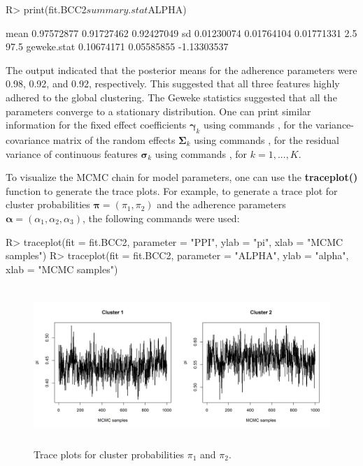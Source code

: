 \begin{example}
R> print(fit.BCC2$summary.stat$ALPHA)
\end{example} 

\begin{example}
                  [,1]       [,2]        [,3]
mean        0.97572877 0.91727462  0.92427049
sd          0.01230074 0.01764104  0.01771331
2.5%
97.5%
geweke.stat 0.10674171 0.05585855 -1.13303537
\end{example}

The output indicated that the posterior means for the adherence parameters were 0.98, 0.92, and 0.92, respectively. This suggested that all three features highly adhered to the global clustering. The Geweke statistics suggested that all the parameters converge to a stationary distribution. One can print similar information for the fixed effect coefficients $\boldsymbol{\gamma}_k$ using commands , for the variance-covariance matrix of the random effects $\boldsymbol{\Sigma}_k$ using commands , for the residual variance of continuous features $\boldsymbol{\sigma}_k$ using commands , for $k=1,...,K$. 

To visualize the MCMC chain for model parameters, one can use the  \textbf{traceplot()} function to generate the trace plots. For example, to generate a trace plot for cluster probabilities $\boldsymbol{\pi} = (\pi_1, \pi_2)$ and the adherence parameters $\boldsymbol{\alpha}=(\alpha_1,\alpha_2,\alpha_3)$, the following commands were used: 

\begin{example}
R> traceplot(fit = fit.BCC2, parameter = "PPI", ylab = "pi", xlab = "MCMC samples")
R> traceplot(fit = fit.BCC2, parameter = "ALPHA", ylab = "alpha", xlab = "MCMC samples")
\end{example} 

\begin{figure}[h]
\centering
\includegraphics[width=\textwidth,height=6cm]{./Figures/trace_ppi.JPEG}
\caption{\label{fig:trace_ppi}  Trace plots for cluster probabilities $\pi_1$ and $\pi_2$.}
\end{figure}

